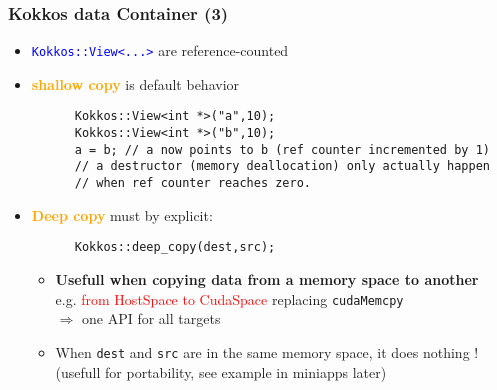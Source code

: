 \begin{frame}[fragile=singleslide]
  \frametitle{Kokkos data Container (3)}

  \begin{itemize}
  \item \textcolor{blue}{\texttt{Kokkos::View<...>}} are reference-counted
  \item \textcolor{orange}{\textbf{shallow copy}} is default behavior
    \begin{verbatim}
      Kokkos::View<int *>("a",10);
      Kokkos::View<int *>("b",10);
      a = b; // a now points to b (ref counter incremented by 1)
      // a destructor (memory deallocation) only actually happen
      // when ref counter reaches zero.
    \end{verbatim}
  \item \textcolor{orange}{\textbf{Deep copy}} must by explicit:
    \begin{verbatim}
      Kokkos::deep_copy(dest,src);
    \end{verbatim}
    \begin{itemize}
    \item \textbf{Usefull when copying data from a memory space to another}\\
      e.g. \textcolor{red}{from HostSpace to CudaSpace} replacing \texttt{cudaMemcpy}\\
      $\Rightarrow$ one API for all targets
    \item When \texttt{dest} and \texttt{src} are in the same memory space, it does nothing ! (usefull for portability, see example in miniapps later)
    \end{itemize}
  \end{itemize}

\end{frame}
